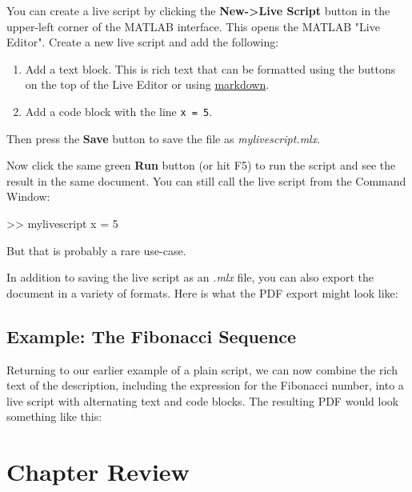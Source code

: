 \documentclass[../../book.tex]{subfiles}
\begin{document}
You can create a live script by clicking the \textbf{New->Live Script} button in the upper-left corner of the MATLAB interface.  This opens the MATLAB "Live Editor".  Create a new live script and add the following:

\begin{enumerate}
\item Add a text block.  This is rich text that can be formatted using the buttons on the top of the Live Editor or using \href{https://www.mathworks.com/help/matlab/matlab_prog/format-live-scripts.html}{markdown}.
\item Add a code block with the line \lstinline{x = 5}.
\end{enumerate}

Then press the \textbf{Save} button to save the file as \emph{mylivescript.mlx}.

Now click the same green \textbf{Run} button (or hit F5) to run the script and see the result in the same document.  You can still call the live script from the Command Window:
\begin{code}
  >> mylivescript
  x =
       5
\end{code}
But that is probably a rare use-case.

In addition to saving the live script as an \emph{.mlx} file, you can also export the document in a variety of formats.  Here is what the PDF export might look like:




\subsection{Example: The Fibonacci Sequence}

Returning to our earlier example of a plain script, we can now combine the rich text of the description, including the expression for the Fibonacci number, into a live script with alternating text and code blocks.  The resulting PDF would look something like this: 


%

\section{Chapter Review}
\end{document}
